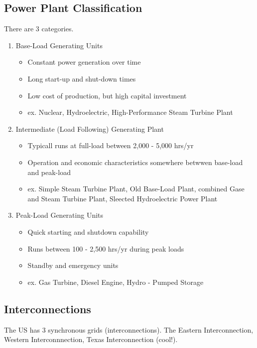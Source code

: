 \documentclass[12pt, a4paper]{report}
\begin{document}
  \subsection{Power Plant Classification}

  There are 3 categories.

  \begin{enumerate}
    \item Base-Load Generating Units
    \begin{itemize}
      \item Constant power generation over time
      \item Long start-up and shut-down times
      \item Low cost of production, but high capital investment
      \item ex. Nuclear, Hydroelectric, High-Performance Steam Turbine Plant
    \end{itemize}
    \item Intermediate (Load Following) Generating Plant
    \begin{itemize}
      \item Typicall runs at full-load between 2,000 - 5,000 hrs/yr
      \item Operation and economic characteristics somewhere betwwen base-load and peak-load
      \item ex. Simple Steam Turbine Plant, Old Base-Load Plant, combined Gase and Steam Turbine Plant, Sleected Hydroelectric Power Plant
    \end{itemize}
    \item Peak-Load Generating Units
    \begin{itemize}
      \item Quick starting and shutdown capability
      \item Runs between 100 - 2,500 hrs/yr during peak loads
      \item Standby and emergency units
      \item ex. Gas Turbine, Diesel Engine, Hydro - Pumped Storage
    \end{itemize}
  \end{enumerate}

  \subsection{Interconnections}

  The US has 3 synchronous grids (interconnections). The Eastern Interconnection, Western Interconnnection, Texas Interconnection (cool!).
\end{document}
